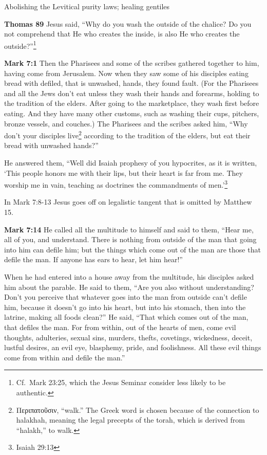 \documentclass[10pt,a5paper,twoside]{article}
\newcommand{\quotesize}{\normalsize{}}
\newcommand{\comm}[1]{\begingroup \color{black!50} #1\endgroup}
\newenvironment{quotetext}{\begingroup\quotesize}{\endgroup}
\newcommand{\intex}[1]{\index[texts]{#1}}
\newcommand{\reftex}[1]{#1\intex{#1}}
\newcommand{\bible}[2]{\begin{quotetext}\textbf{#1}\intex{#1} #2\end{quotetext}}
\newcommand{\gospelmark}[2]{\bible{Mark #1}{#2}}
\newcommand{\thomas}[2]{\bible{Thomas #1}{#2}}
\begin{document}
\begin{section}{Abolishing the Levitical purity laws; healing gentiles}

\thomas{89}{
Jesus said, ``Why do you wash the outside of the chalice? Do you not comprehend that He who creates the inside, is also He who creates 
the outside?''\footnote{Cf.~Mark
23:25, which the Jesus Seminar consider less likely to be authentic.}
}

\gospelmark{7:1}{
 Then the Pharisees and some of the scribes gathered together to him, having come from Jerusalem.   Now when they saw some of his disciples eating bread with defiled, that is unwashed, hands, they found fault.   (For the Pharisees and all the Jews don't eat unless they wash their hands and forearms, holding to the tradition of the elders.
After going to the marketplace, they wash first before eating. And they have many other customs, such as washing
their cups, pitchers, bronze vessels, and couches.)   The Pharisees and the scribes asked him, ``Why don't your disciples 
live\footnote{Περιπατοῦσιν, ``walk.'' The Greek word is chosen because of the connection
to halakhah, meaning the legal precepts of the torah, which
is derived from ``halakh,'' to walk.} according to the tradition of the elders, but eat their bread with unwashed hands?''


  He answered them, ``Well did Isaiah prophesy of you hypocrites, as it is written,
`This people honors me with their lips,
but their heart is far from me.
   They worship me in vain,
teaching as doctrines the commandments of men.'\footnote{\reftex{Isaiah 29:13}}}

\comm{In \reftex{Mark 7:8-13} Jesus goes off on legalistic tangent that is omitted by Matthew 15.}

\gospelmark{7:14}{
  He called all the multitude to himself and said to them, ``Hear me, all of you, and understand.    There is nothing from outside of the man that going into him can defile him; but the things which come out of the man are those that defile the man.    If anyone has ears to hear, let him hear!''

  When he had entered into a house away from the multitude, his disciples asked him about the parable.   He said to them, ``Are you also without understanding? Don't you perceive that whatever goes into the man from outside can't defile him,    because it doesn't go into his heart, but into his stomach, then into the latrine, making all foods clean?''   He said, ``That which comes out of the man, that defiles the man.    For from within, out of the hearts of men, come evil thoughts, adulteries, sexual sins, murders, thefts,    covetings, wickedness, deceit, lustful desires, an evil eye, blasphemy, pride, and foolishness.    All these evil things come from within and defile the man.''
}


\end{section}
\end{document}
